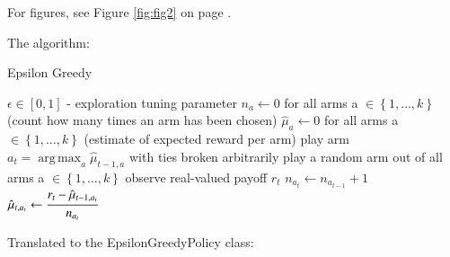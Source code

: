 \documentclass[nojss]{jss}\usepackage[]{graphicx}\usepackage[]{color}
\DeclareMathOperator*{\argmax}{arg\,max}
\begin{document}
For figures, see Figure \ref{fig:fig2} on page \pageref{fig:fig2}.

The algorithm:

\begin{algorithm}
\caption{Epsilon Greedy}
\label{Alg:EpsilonGreedy}
\begin{algorithmic}
\REQUIRE \(    \epsilon  \in \left[ 0,1 \right] \) - exploration tuning parameter
\STATE \( n_{a} \leftarrow 0 \) for all arms a \(  \in \left\{ 1, \dots, k \right\} \)  (count how many times an arm has been chosen)
\STATE \( \hat{\mu}_{a} \leftarrow 0 \) for all arms a  \(   \in \left\{ 1, \dots, k \right\} \)  (estimate of expected reward per arm)
		\STATE play arm \(a_t = \argmax_a  \hat{\mu}_{t-1,a}  \) with ties broken arbitrarily
	\ELSE
		\STATE play a random arm out of all arms a \(  \in \left\{ 1, \dots, k \right\} \)
	\ENDIF
	\STATE observe real-valued payoff $r_t$
	\STATE \( n_{a_{t}} \leftarrow n_{a_{t-1}} + 1  \)
   \STATE \( \hat{\mu}_{t,a_{t}} \leftarrow   \cfrac{r_t - \hat{\mu}_{t-1,a_{t}} }{n_{a_{t}}}   \)
\ENDFOR
\end{algorithmic}
\end{algorithm}

Translated to the EpsilonGreedyPolicy class:
\end{document}
